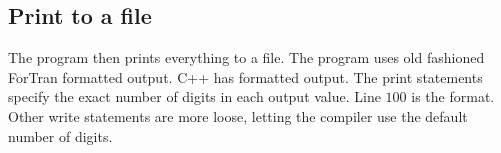 \documentclass{article}
\begin{document}
\subsection{Print to a file}

The program then prints everything to a file. The program uses old fashioned
ForTran formatted output. C++ has formatted output. The print statements
specify the exact number of digits in each output value. Line $100$ is the
format. Other write statements are more loose, letting the compiler use the
default number of digits.
\end{document}
